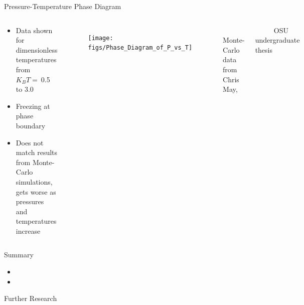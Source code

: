 \documentclass{beamer}
\begin{document}
\begin{frame}{Pressure-Temperature Phase Diagram}
\begin{columns}
	    \vspace{-2.2em}
        \begin{block}{}
            \begin{itemize}
            \item Data shown for dimensionless temperatures from $K_BT=~$0.5 to 3.0
            \item Freezing at phase boundary
            \item Does not match results from Monte-Carlo simulations, 
            gets worse as pressures and temperatures increase
            \end{itemize}
            \end{block}
         \begin{figure}       
           \centering
            \texttt{[image: figs/Phase\_Diagram\_of\_P\_vs\_T]}\\
          \end{figure}  
        \vspace{-1em}
        \footnotesize $~~~~~~~~~~~~$Monte-Carlo data from Chris May, 
    
         $~~~~~~~~~~~~$OSU undergraduate thesis
        \normalsize
     \end{columns}
\end{frame}


\begin{frame}{Summary}
\vspace{-2em}
        \begin{block}{}
            \begin{itemize}
            \item 
            \item
            \end{itemize}
         \end{block}
\end{frame}

\begin{frame}{Further Research}
\end{frame}
\end{document}
